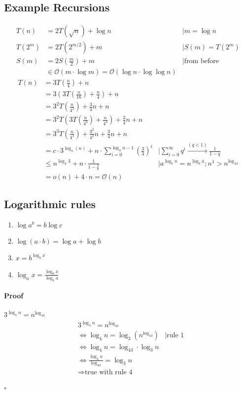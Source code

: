 \subsection{Example Recursions}

\begin{align*}
	T(n) &= 2 T(\sqrt{n}) + \log n & | m = \log n \\
	T(2^m)&= 2 T(2^{m/2}) + m & | S(m) = T(2^m) \\
	S(m) &= 2 S\left(\frac{m}{2}\right) + m & | \text{from before} \\
	& \in \mathcal{O}(m \cdot \log m) = \mathcal{O}(\log n \cdot \log \log n)
\end{align*}
\begin{align*}
T(n) &= 3T\left(\frac{n}{4}\right)+n \\
&= 3 \left(3 T\left(\frac{n}{16}\right)+\frac{n}{4}\right) +n \\
&= 3^2 T\left(\frac{n}{4^2}\right) + \frac{3}{4}n + n \\
&= 3^2 T\left(3 T \left(\frac{n}{4^3}\right)+\frac{n}{4^3}\right)+ \frac{3}{4}n + n \\
&= 3^3 T\left(\frac{n}{4^3}\right) + \frac{3^2}{4^2}n + \frac{3}{4}n + n \\
&= c \cdot 3^{\log_4(n)} + n \cdot \sum_{i=0}^{\log_4 n-1}\left(\frac{3}{4}\right)^i & | \sum_{i=0}^{\infty} q^i \stackrel{(q<1)}{\rightarrow} \frac{1}{1-q}\\
& \leq  n^{\log_4 3} + n \cdot \frac{1}{1-\frac{3}{4}} & | a^{\log_b n} = n^{\log_b a}; n^1 > n^{\log_43} \\
&= o(n) + 4\cdot n = \mathcal{O}(n)
\end{align*}

\subsection{Logarithmic rules}
\begin{enumerate}
\item $\log a^b = b \log c$
\item $\log(a\cdot b) = \log a+\log b$
\item $x=b ^{\log_bx}$
\item $\log_ax = \frac{\log_bx}{\log_ba}$
\end{enumerate}


\paragraph{Proof} $3^{\log_4n} = n^{\log_43}$
\begin{align*}
	&3^{\log_4n} = n^{\log_43} \\
	&\Leftrightarrow \log_4n = \log_3(n^{\log_43}) & | \text{rule 1}\\
	&\Leftrightarrow  \log_4n = \log_43 \cdot \log_3n \\
	&\Leftrightarrow  \frac{\log_4n}{\log_43} = \log_3n \\
	& \Rightarrow  \text{true with rule 4}
\end{align*}
\begin{flushright}
	$\square$
\end{flushright}


